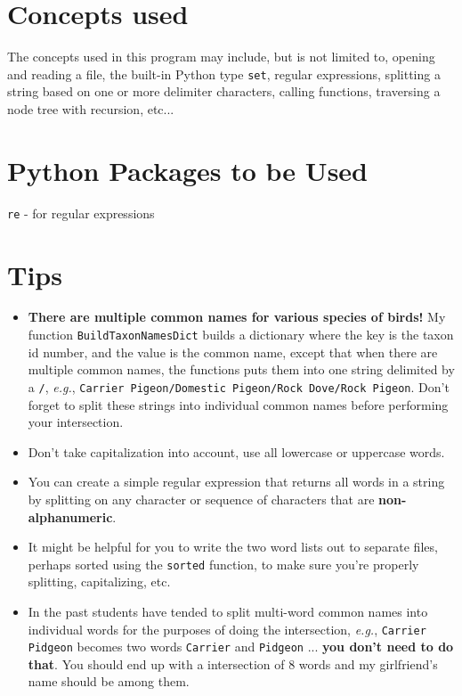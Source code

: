 \documentclass[11pt]{amsart}
\begin{document}
\section*{Concepts used}
The concepts used in this program may include, but is not limited to, opening and reading a file, the built-in Python type \texttt{set}, regular expressions, splitting a string based on one or more delimiter characters, calling functions, traversing a node tree with recursion, etc...

\section*{Python Packages to be Used}
\texttt{re} - for regular expressions

\section*{Tips}
\begin{itemize}
  \item \textbf{There are multiple common names for various species of birds!} My function \texttt{BuildTaxonNamesDict} builds a dictionary where the key is the taxon id number, and the value is the common name, except that when there are multiple common names, the functions puts them into one string delimited by a \texttt{/}, \textit{e.g.}, \texttt{Carrier Pigeon/Domestic Pigeon/Rock Dove/Rock Pigeon}. Don't forget to split these strings into individual common names before performing your intersection.
  \item Don't take capitalization into account, use all lowercase or uppercase words.
  \item You can create a simple regular expression that returns all words in a string by splitting on any character or sequence of characters that are \textbf{non-alphanumeric}.
  \item It might be helpful for you to write the two word lists out to separate files, perhaps sorted using the \texttt{sorted} function, to make sure you're properly splitting, capitalizing, etc.
  \item In the past students have tended to split multi-word common names into individual words for the purposes of doing the intersection, \textit{e.g.}, \texttt{Carrier Pidgeon} becomes two words \texttt{Carrier} and \texttt{Pidgeon} ... \textbf{you don't need to do that}. You should end up with a intersection of 8 words and my girlfriend's name should be among them.
\end{itemize}
\end{document}
